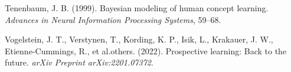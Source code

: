 \documentclass[10pt, letterpaper]{article}
\newenvironment{CSLReferences}%
  {}%
  {\par}
\begin{document}
\begin{CSLReferences}{1}{0}
\leavevmode{}%
Tenenbaum, J. B. (1999). Bayesian modeling of human concept learning.
\emph{Advances in Neural Information Processing Systems}, 59--68.

\leavevmode{}%
Vogelstein, J. T., Verstynen, T., Kording, K. P., Isik, L., Krakauer, J.
W., Etienne-Cummings, R., et al.others. (2022). Prospective learning:
Back to the future. \emph{arXiv Preprint arXiv:2201.07372}.

\end{CSLReferences}


\end{document}
